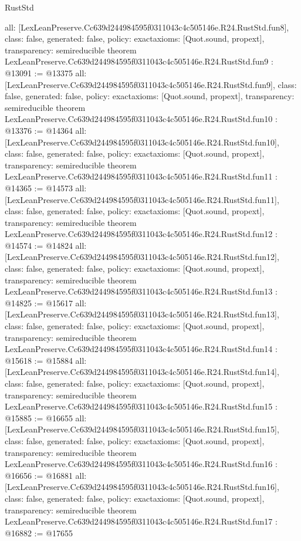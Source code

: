 \begin{lexlean}{RustStd}
\begin{coremodule}
{  all: [LexLeanPreserve.Cc639d244984595f0311043c4c505146e.R24.RustStd.fun8],
  class: false,
  generated: false,
  policy: exact{axioms: [Quot.sound, propext]},
  transparency: semireducible
}
theorem LexLeanPreserve.Cc639d244984595f0311043c4c505146e.R24.RustStd.fun9 : @13091 := @13375 {
  all: [LexLeanPreserve.Cc639d244984595f0311043c4c505146e.R24.RustStd.fun9],
  class: false,
  generated: false,
  policy: exact{axioms: [Quot.sound, propext]},
  transparency: semireducible
}
theorem LexLeanPreserve.Cc639d244984595f0311043c4c505146e.R24.RustStd.fun10 : @13376 := @14364 {
  all: [LexLeanPreserve.Cc639d244984595f0311043c4c505146e.R24.RustStd.fun10],
  class: false,
  generated: false,
  policy: exact{axioms: [Quot.sound, propext]},
  transparency: semireducible
}
theorem LexLeanPreserve.Cc639d244984595f0311043c4c505146e.R24.RustStd.fun11 : @14365 := @14573 {
  all: [LexLeanPreserve.Cc639d244984595f0311043c4c505146e.R24.RustStd.fun11],
  class: false,
  generated: false,
  policy: exact{axioms: [Quot.sound, propext]},
  transparency: semireducible
}
theorem LexLeanPreserve.Cc639d244984595f0311043c4c505146e.R24.RustStd.fun12 : @14574 := @14824 {
  all: [LexLeanPreserve.Cc639d244984595f0311043c4c505146e.R24.RustStd.fun12],
  class: false,
  generated: false,
  policy: exact{axioms: [Quot.sound, propext]},
  transparency: semireducible
}
theorem LexLeanPreserve.Cc639d244984595f0311043c4c505146e.R24.RustStd.fun13 : @14825 := @15617 {
  all: [LexLeanPreserve.Cc639d244984595f0311043c4c505146e.R24.RustStd.fun13],
  class: false,
  generated: false,
  policy: exact{axioms: [Quot.sound, propext]},
  transparency: semireducible
}
theorem LexLeanPreserve.Cc639d244984595f0311043c4c505146e.R24.RustStd.fun14 : @15618 := @15884 {
  all: [LexLeanPreserve.Cc639d244984595f0311043c4c505146e.R24.RustStd.fun14],
  class: false,
  generated: false,
  policy: exact{axioms: [Quot.sound, propext]},
  transparency: semireducible
}
theorem LexLeanPreserve.Cc639d244984595f0311043c4c505146e.R24.RustStd.fun15 : @15885 := @16655 {
  all: [LexLeanPreserve.Cc639d244984595f0311043c4c505146e.R24.RustStd.fun15],
  class: false,
  generated: false,
  policy: exact{axioms: [Quot.sound, propext]},
  transparency: semireducible
}
theorem LexLeanPreserve.Cc639d244984595f0311043c4c505146e.R24.RustStd.fun16 : @16656 := @16881 {
  all: [LexLeanPreserve.Cc639d244984595f0311043c4c505146e.R24.RustStd.fun16],
  class: false,
  generated: false,
  policy: exact{axioms: [Quot.sound, propext]},
  transparency: semireducible
}
theorem LexLeanPreserve.Cc639d244984595f0311043c4c505146e.R24.RustStd.fun17 : @16882 := @17655 {
}
\end{coremodule}
\end{lexlean}
